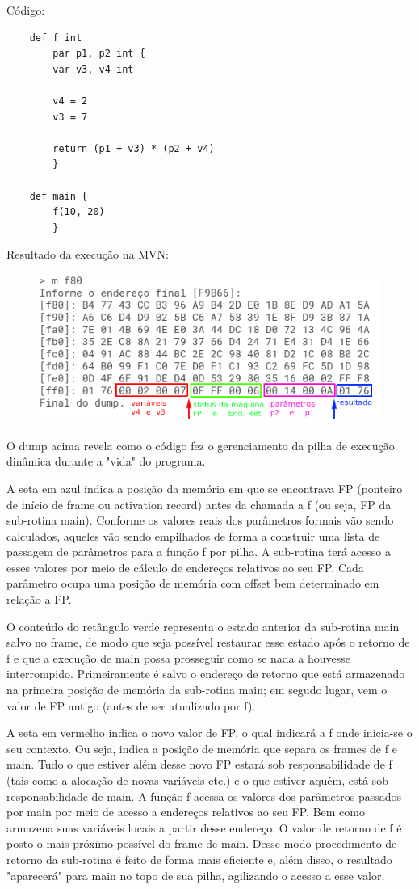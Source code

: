 \documentclass[a4paper,12pt]{report}
\begin{document}
    Código:
    \begin{lstlisting}
    def f int 
        par p1, p2 int {
        var v3, v4 int

        v4 = 2
        v3 = 7

        return (p1 + v3) * (p2 + v4)
        }

    def main {
        f(10, 20)
        }
    \end{lstlisting}
    Resultado da execução na MVN:
    \begin{figure}[h]
        \centering
        \includegraphics[scale=0.65]{chamada_subrotina}
    \end{figure}

    O dump acima revela como o código fez o gerenciamento da pilha de execução dinâmica durante a "vida" do programa.

    A seta em azul indica a posição da memória em que se encontrava FP (ponteiro de início de frame ou activation record) antes da chamada a f (ou seja, FP da sub-rotina main).
    Conforme os valores reais dos parâmetros formais vão sendo calculados, aqueles vão sendo empilhados de forma a construir uma lista de passagem de parâmetros para a função f por pilha. A sub-rotina terá acesso a esses valores por meio de cálculo de endereços relativos ao seu FP. Cada parâmetro ocupa uma posição de memória com offset bem determinado em relação a FP.

    O conteúdo do retângulo verde representa o estado anterior da sub-rotina main salvo no frame, de modo que seja possível restaurar esse estado após o retorno de f e que a execução de main possa prosseguir como se nada a houvesse interrompido. Primeiramente é salvo o endereço de retorno que está armazenado na primeira posição de memória da sub-rotina main; em segudo lugar, vem o valor de FP antigo (antes de ser atualizado por f).

    A seta em vermelho indica o novo valor de FP, o qual indicará a f onde inicia-se o seu contexto. Ou seja, indica a posição de memória que separa os frames de f e main. Tudo o que estiver além desse novo FP estará sob responsabilidade de f (tais como a alocação de novas variáveis etc.) e o que estiver aquém, está sob responsabilidade de main. A função f acessa os valores dos parâmetros passados por main por meio de acesso a endereços relativos ao seu FP. Bem como armazena suas variáveis locais a partir desse endereço. O valor de retorno de f é posto o mais próximo possível do frame de main. Desse modo procedimento de retorno da sub-rotina é feito de forma mais eficiente e, além disso, o resultado "aparecerá" para main no topo de sua pilha, agilizando o acesso a esse valor.
\end{document}
